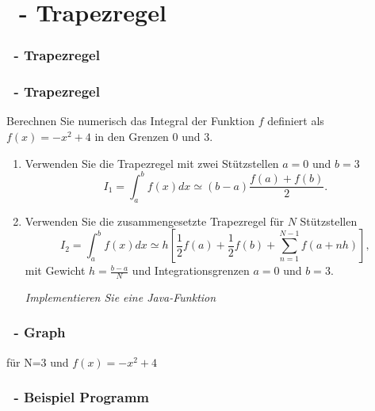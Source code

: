 \def\stitle{\theexercise\ - Trapezregel}
\section{\stitle}
\begin{frame}
  \frametitle{\stitle}%
\tableofcontents[current]
\end{frame}


\begin{frame}[fragile]%
    \frametitle{\stitle}

Berechnen Sie numerisch das Integral der Funktion $f$ definiert als $f(x) = -x^2+4$ in den Grenzen $0$ und $3$.
\begin{enumerate}
\item Verwenden Sie die Trapezregel mit zwei St\"utzstellen $a=0$ und $b=3$
\[
I_1
= \int_a^b f(x)dx
\simeq (b-a)\frac{f(a)+f(b)}{2}
.\]
\item Verwenden Sie die zusammengesetzte Trapezregel für $N$ St\"utzstellen
\[
I_2
= \int_a^b f(x)dx
\simeq h \left[\frac{1}{2}f(a)+\frac{1}{2}f(b)+\sum_{n=1}^{N-1}f\left(a+nh \right)\right]
,\]
mit Gewicht $h = \frac{b-a}{N}$ und Integrationsgrenzen $a=0$ und $b=3$.

\emph{Implementieren Sie eine Java-Funktion}

\end{enumerate}

\end{frame}


\begin{frame}[t]%
  \frametitle{\theexercise\ - Graph}%
 für N=3 und $f(x)=-x^2+4$



\end{frame}


\begin{frame}[t]%
  \frametitle{\theexercise\ - Beispiel Programm}%


\end{frame}


